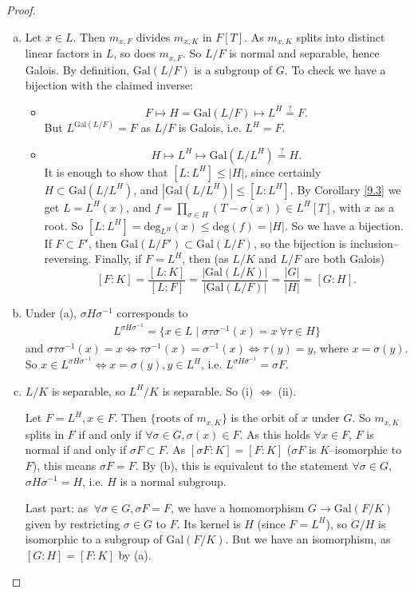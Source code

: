 \documentclass{article}
\theoremstyle{definition}
\begin{document}
\begin{proof}
    \begin{enumerate}[(a)]
        \item Let $x \in L$. Then $m_{x,F}$ divides $m_{x,K}$ in $F[T]$. As $m_{x,K}$ splits into distinct linear factors in $L$, so does $m_{x,F}$. So $L/F$ is normal and separable, hence Galois. By definition, $\text{Gal}(L/F)$ is a subgroup of $G$. To check we have a bijection with the claimed inverse:
        \begin{itemize}
            \item $$F \mapsto H = \text{Gal}(L/F) \mapsto L^H \stackrel{?}{=} F.$$
            But $L^{\text{Gal}(L/F)}=F$ as $L/F$ is Galois, i.e. $L^H = F$.
            \item $$H \mapsto L^H \mapsto \text{Gal}(L/L^H) \stackrel{?}{=} H.$$
            It is enough to show that $[L:L^H] \le |H|$, since certainly $H \subset \text{Gal}(L/L^H)$, and $|\text{Gal}(L/L^H)| \le [L : L^H]$. By Corollary \ref{9.3} we get $L=L^H(x)$, and $f = \prod_{\sigma \in H}^{} (T-\sigma(x)) \in L^H[T]$, with $x$ as a root. So $[L : L^H] = \text{deg}_{L^H}(x) \le \text{deg}(f) = |H|$. So we have a bijection. If $F \subset F'$, then $\text{Gal}(L/F') \subset \text{Gal}(L/F)$, so the bijection is inclusion--reversing. Finally, if $F=L^H$, then (as $L/K$ and $L/F$ are both Galois) \[
            [F:K] = \frac{[L:K]}{[L:F]} = \frac{|\text{Gal}(L/K)|}{|\text{Gal}(L/F)|} = \frac{|G|}{|H|} = [G:H].
            \]
        \end{itemize}
        \item Under (a), $\sigma H \sigma^{-1}$ corresponds to
        \begin{align*}
            L^{\sigma H \sigma^{-1}} = \{x \in L \mid \sigma \tau \sigma^{-1}(x)=x ~\forall \tau \in H\}
        \end{align*}
        and $\sigma \tau \sigma^{-1}(x)=x \iff \tau \sigma^{-1}(x) = \sigma^{-1}(x) \iff \tau(y)=y$, where ${x = \sigma(y)}$. So $x \in L^{\sigma H \sigma^{-1}} \iff x = \sigma(y), y \in L^H$, i.e. $L^{\sigma H \sigma^{-1}} = \sigma F$.
        \item $L/K$ is separable, so $L^H/K$ is separable. So (i) $\iff$ (ii).

        Let $F = L^H, x \in F$. Then $\{\text{roots of }m_{x,K}\}$ is the orbit of $x$ under $G$. So $m_{x,K}$ splits in $F$ if and only if $\forall \sigma \in G, \sigma(x) \in F$. As this holds $\forall x \in F$, $F$ is normal if and only if $\sigma F \subset F$. As $[\sigma F : K] = [F : K]$ ($\sigma F$ is $K$--isomorphic to $F$), this means $\sigma F = F$. By (b), this is equivalent to the statement $\forall \sigma \in G$, $\sigma H \sigma^{-1} = H$, i.e. $H$ is a normal subgroup.
        \vspace{1mm}

        Last part: as $~\forall \sigma \in G, \sigma F = F$, we have a homomorphism $G \to \text{Gal}(F/K)$ given by restricting $\sigma \in G$ to $F$. Its kernel is $H$ (since $F = L^H$), so $G/H$ is isomorphic to a subgroup of $\text{Gal}(F/K)$. But we have an isomorphism, as $[G:H] = [F:K]$ by (a).
    \end{enumerate}
\end{proof}
\end{document}
